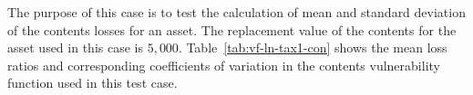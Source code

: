 The purpose of this case is to test the calculation of mean and standard deviation of the contents losses for an asset. The replacement value of the contents for the asset used in this case is $5,000$. Table~\ref{tab:vf-ln-tax1-con} shows the mean loss ratios and corresponding coefficients of variation in the contents vulnerability function used in this test case.